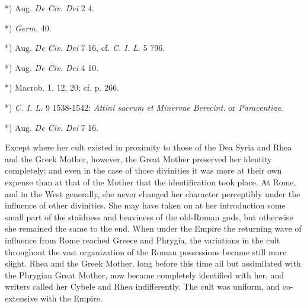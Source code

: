 \documentclass[a4paper, 11pt, oneside, polutonikogreek, english]{article}
\begin{document}
*) Aug. \emph{De Civ. Dei} 2 4.

*) \emph{Germ.} 40.

*) Aug. \emph{De Civ. Dei} 7 16, cf. \emph{C. I. L.} 5 796.

*) Aug. \emph{De Civ. Dei} 4 10.

*) Macrob. 1. 12, 20; cf. p. 266.

*) \emph{C. I. L.} 9 1538-1542: \emph{Attini sacrum et Minervae Berecint.} or \emph{Paracentiae}.

*) Aug. \emph{De Civ. Dei} 7 16.

Except where her cult existed in proximity to those of the Dea Syria and Rhea and the Greek Mother, however, the Great Mother preserved her identity completely; and even in the case of those divinities it was more at their own expense than at that of the Mother that the identification took place. At Rome, and in the West generally, she never changed her character perceptibly under the influence of other divinities. She may have taken on at her introduction some small part of the staidness and heaviness of the old-Roman gods, but otherwise she remained the same to the end. When under the Empire the returning wave of influence from Rome reached Greece and Phrygia, the variations in the cult throughout the vast organization of the Roman possessions became still more slight. Rhea and the Greek Mother, long before this time ail but assimilated with the Phrygian Great Mother, now became completely identified with her, and writers called her Cybele and Rhea indifferently. The cult was uniform, and co-extensive with the Empire.
\end{document}

